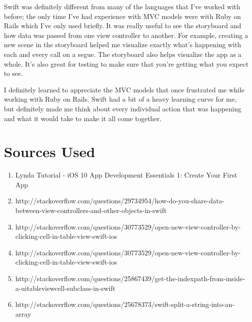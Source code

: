 \documentclass[12pt]{article}
\begin{document}
\noindent Swift was definitely different from many of the languages that I've worked with before; the only time I've had experience with MVC models were with Ruby on Rails which I've only used briefly. It was really useful to see the storyboard and how data was passed from one view controller to another. For example, creating a new scene in the storyboard helped me visualize exactly what's happening with each and every call on a segue. The storyboard also helps visualize the app as a whole. It's also great for testing to make sure that you're getting what you expect to see.
\break

\noindent I definitely learned to appreciate the MVC models that once frustrated me while working with Ruby on Rails. Swift had a bit of a heavy learning curve for me, but definitely made me think about every individual action that was happening and what it would take to make it all come together. 


\section{Sources Used}
\begin{enumerate}
\item Lynda Tutorial - iOS 10 App Development Essentials 1: Create Your First App
\item http://stackoverflow.com/questions/29734954/how-do-you-share-data-between-view-controllers-and-other-objects-in-swift
\item http://stackoverflow.com/questions/30773529/open-new-view-controller-by-clicking-cell-in-table-view-swift-ios
\item http://stackoverflow.com/questions/30773529/open-new-view-controller-by-clicking-cell-in-table-view-swift-ios
\item http://stackoverflow.com/questions/25867439/get-the-indexpath-from-inside-a-uitableviewcell-subclass-in-swift
\item http://stackoverflow.com/questions/25678373/swift-split-a-string-into-an-array
\end{enumerate}
\end{document}
